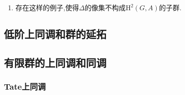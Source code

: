 \begin{enumerate}
\begin{proof}
\begin{itemize}
			\item $\mathrm{H}^1(G,C)$处的正合性(此时我们约定$A$在$B$的中心里).取$B$上的1余圈$f:G\to B$,那么$p\circ f$是$C$上的1余圈,那么$\Delta(p\circ f)$是映射$h:G\times G\to A$,对任意$s\in G$,取$g(s)\in B$使得$p(g(s))=p(f(s))$,这里我们可以干脆取$g=f$本身,那么$h(s,t)=f(s)s(f(t))f(st)^{-1}$,这是一个2余边界,于是$p_1$的像落在$\Delta$的核中.反过来如果$f(s)$是$C$上的一个1余圈,满足$\Delta(f)$是零调的.如果取$g(s)\in B$使得$p(g(s))=f(s)$,那么就是说$h(s,t)=g(s)s(g(t))g(st)^{-1}$是零调的,于是它可以表示为$k(s)s(k(t))k(st)^{-1}$,其中$k:G\to A$的映射.如果记$g'(s)=k(s)^{-1}g(s)$,那么这是$B$上的一个1余圈,它也满足$p(g'(s))=p(f(s)^{-1}g(s))=p(g(s))=f(s)$,于是$f(s)$在$p_1$的像中.
		\end{itemize}
	\end{proof}
	\item 存在这样的例子,使得$\Delta$的像集不构成$\mathrm{H}^2(G,A)$的子群.
\end{enumerate}
\newpage
\subsection{低阶上同调和群的延拓}

\newpage
\subsection{有限群的上同调和同调}
\subsubsection{Tate上同调}

